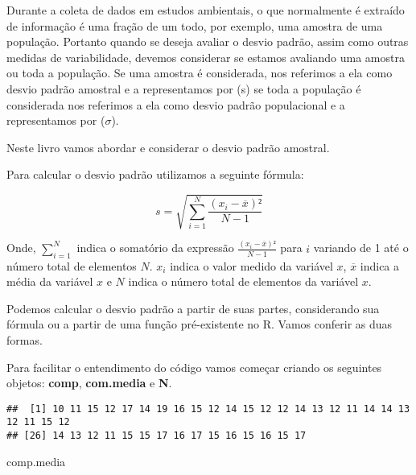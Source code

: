 \documentclass[14pt,titlepage, oneside, openany, a4paper]{book}
\newenvironment{Shaded}{\begin{snugshade}}{\end{snugshade}}
\newcommand{\KeywordTok}[1]{\textcolor[rgb]{0.13,0.29,0.53}{\textbf{#1}}}
\newcommand{\NormalTok}[1]{#1}
\newcommand{\OperatorTok}[1]{\textcolor[rgb]{0.81,0.36,0.00}{\textbf{#1}}}
\newcommand{\StringTok}[1]{\textcolor[rgb]{0.31,0.60,0.02}{#1}}
\begin{document}
Durante a coleta de dados em estudos ambientais, o que normalmente é extraído de informação é uma fração de um todo, por exemplo, uma amostra de uma população. Portanto quando se deseja avaliar o desvio padrão, assim como outras medidas de variabilidade, devemos considerar se estamos avaliando uma amostra ou toda a população. Se uma amostra é considerada, nos referimos a ela como desvio padrão amostral e a representamos por (s) se toda a população é considerada nos referimos a ela como desvio padrão populacional e a representamos por (\(\sigma\)).

Neste livro vamos abordar e considerar o desvio padrão amostral.

Para calcular o desvio padrão utilizamos a seguinte fórmula:

\[s = \sqrt{\sum^{N}_{i = 1}\frac{(x_{i}-\overline{x})²}{N-1}}\]

Onde, \(\sum^{N}_{i=1}\) indica o somatório da expressão \(\frac{(x_{i}-\overline{x})²}{N-1}\) para \(i\) variando de 1 até o número total de elementos \(N\). \(x_{i}\) indica o valor medido da variável \(x\), \(\overline{x}\) indica a média da variável \(x\) e \(N\) indica o número total de elementos da variável \(x\).

Podemos calcular o desvio padrão a partir de suas partes, considerando sua fórmula ou a partir de uma função pré-existente no R. Vamos conferir as duas formas.

Para facilitar o entendimento do código vamos começar criando os seguintes objetos: \textbf{comp}, \textbf{com.media} e \textbf{N}.

\begin{Shaded}
\end{Shaded}

\begin{verbatim}
##  [1] 10 11 15 12 17 14 19 16 15 12 14 15 12 12 14 13 12 11 14 14 13 12 11 15 12
## [26] 14 13 12 11 15 15 17 16 17 15 16 15 16 15 17
\end{verbatim}

\begin{Shaded}
\begin{Highlighting}[]
\NormalTok{comp.media}
\end{Highlighting}
\end{Shaded}
\end{document}

